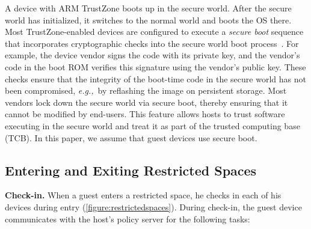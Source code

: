 \documentclass[pageno]{sig-alternate-05-2015}
\newcommand{\figref}[1]{\autoref{#1}}
\newcommand{\myparagraph}[1]{\indent\par\noindent\textsf{\textbf{#1.}}}
\newcommand{\eg}{\textit{e.g.,}}
\begin{document}
A device with ARM TrustZone boots up in the secure world. After the secure
world has initialized, it switches to the normal world and boots the OS there.
Most TrustZone-enabled devices are configured to execute a \textit{secure boot}
sequence that incorporates cryptographic checks into the secure world boot
process~\cite[\S5.2.2]{armtz}. For example, the device vendor signs the code
with its private key, and the vendor's code in the boot ROM verifies this
signature using the vendor's public key. These checks ensure that the integrity
of the boot-time code in the secure world has not been compromised, \eg~by
reflashing the image on persistent storage. Most vendors lock down the secure
world via secure boot, thereby ensuring that it cannot be modified by
end-users. This feature allows hosts to trust software executing in the secure
world and treat it as part of the trusted computing base (TCB). In this paper,
we assume that guest devices use secure boot.

\subsection{Entering and Exiting Restricted Spaces}
\label{section:usagemodel:checkin}

\myparagraph{Check-in} When a guest enters a restricted space, he checks in
each of his devices during entry (\figref{figure:restrictedspaces}).  During
check-in, the guest device communicates with the host's policy server for the
following tasks:
\end{document}
